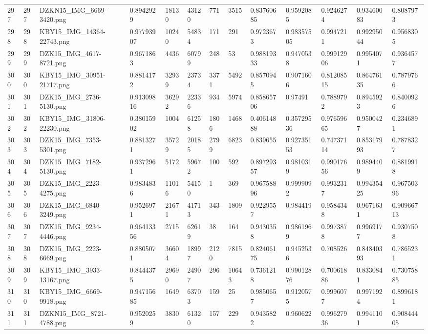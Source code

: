 \documentclass[11pt, a4paper, twoside]{report}
\begin{document}
\begin{longtable}[c]{@{}lllllllllllll@{}}
297 & 297 & DZKN15\_IMG\_6669-3420.png & 0.8942929 & 18130 & 43120 & 771 & 3515 & 0.83760685 & 0.9592085 & 0.9246274 & 0.93460083 & 0.8087973 \\
298 & 298 & KBY15\_IMG\_14364-22743.png & 0.97793907 & 10240 & 54834 & 171 & 291 & 0.9723673 & 0.98357505 & 0.9947211 & 0.99295044 & 0.9568305 \\
299 & 299 & DZK15\_IMG\_4617-8721.png & 0.9671863 & 4436 & 60799 & 248 & 53 & 0.98819333 & 0.9470538 & 0.99912906 & 0.9954071 & 0.9364577 \\
300 & 300 & KBY15\_IMG\_30951-21717.png & 0.8814172 & 32939 & 23734 & 3371 & 5492 & 0.8570945 & 0.9071606 & 0.81208515 & 0.86476135 & 0.7879766 \\
301 & 301 & DZK15\_IMG\_2736-5130.png & 0.91309816 & 36292 & 22336 & 934 & 5974 & 0.85865706 & 0.97491 & 0.7889792 & 0.8945923 & 0.8400926 \\
302 & 302 & KBY15\_IMG\_31806-22230.png & 0.38015902 & 1004 & 61258 & 1806 & 1468 & 0.40614888 & 0.35729536 & 0.97659665 & 0.9500427 & 0.2346891 \\
303 & 303 & DZK15\_IMG\_7353-5301.png & 0.8813271 & 35729 & 20185 & 2799 & 6823 & 0.839655 & 0.92735153 & 0.74737114 & 0.85317993 & 0.7878327 \\
304 & 304 & DZK15\_IMG\_7182-5130.png & 0.9372961 & 5172 & 59672 & 100 & 592 & 0.89729357 & 0.9810319 & 0.99017656 & 0.9894409 & 0.8819918 \\
305 & 305 & DZK15\_IMG\_2223-4275.png & 0.9834836 & 11016 & 54150 & 1 & 369 & 0.96758896 & 0.9999092 & 0.9932317 & 0.99435425 & 0.96750396 \\
306 & 306 & DZK15\_IMG\_6840-3249.png & 0.9526971 & 21671 & 41713 & 343 & 1809 & 0.9229557 & 0.984419 & 0.9584348 & 0.9671631 & 0.90966713 \\
307 & 307 & DZK15\_IMG\_9234-4446.png & 0.96413356 & 2715 & 62619 & 38 & 164 & 0.9430358 & 0.9861969 & 0.9973878 & 0.9969177 & 0.9307508 \\
308 & 308 & DZK15\_IMG\_2223-6669.png & 0.8805071 & 36604 & 18997 & 2120 & 7815 & 0.82406175 & 0.9452536 & 0.708526 & 0.84840393 & 0.7865231 \\
309 & 309 & KBY15\_IMG\_3933-13167.png & 0.8444375 & 29690 & 24907 & 296 & 10643 & 0.7361218 & 0.99012876 & 0.70061886 & 0.8330841 & 0.73075885 \\
310 & 310 & KBY15\_IMG\_6669-9918.png & 0.94715685 & 1649 & 63703 & 159 & 25 & 0.9850657 & 0.9120575 & 0.9996077 & 0.9971924 & 0.8996181 \\
311 & 311 & DZKN15\_IMG\_8721-4788.png & 0.9520259 & 3830 & 61320 & 157 & 229 & 0.9435822 & 0.960622 & 0.99627936 & 0.9941101 & 0.90844405 \\

\end{longtable}
\end{document}

